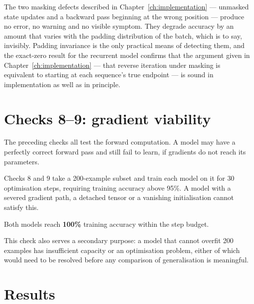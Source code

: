  The two masking defects described in
Chapter~\ref{ch:implementation} --- unmasked state updates and a backward pass beginning at the
wrong position --- produce no error, no warning and no visible symptom. They degrade accuracy by an
amount that varies with the padding distribution of the batch, which is to say, invisibly. Padding
invariance is the only practical means of detecting them, and the exact-zero result for the
recurrent model confirms that the argument given in Chapter~\ref{ch:implementation} --- that
reverse iteration under masking is equivalent to starting at each sequence's true endpoint --- is
sound in implementation as well as in principle.

\section{Checks 8--9: gradient viability}

The preceding checks all test the forward computation. A model may have a perfectly correct forward
pass and still fail to learn, if gradients do not reach its parameters.

Checks 8 and 9 take a 200-example subset and train each model on it for 30 optimisation steps,
requiring training accuracy above 95\%. A model with a severed gradient path, a detached tensor or
a vanishing initialisation cannot satisfy this.

Both models reach \textbf{100\%} training accuracy within the step budget.

This check also serves a secondary purpose: a model that cannot overfit 200 examples has
insufficient capacity or an optimisation problem, either of which would need to be resolved before
any comparison of generalisation is meaningful.

\section{Results}

